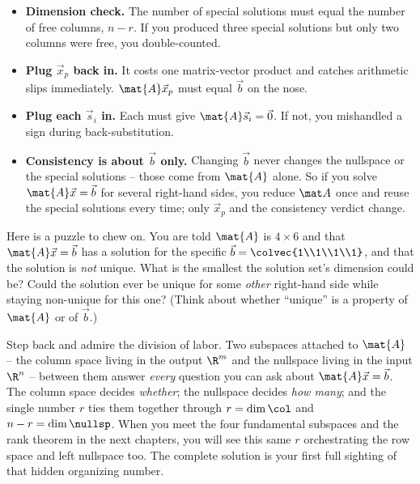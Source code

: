 \begin{itemize}
  \item \textbf{Dimension check.} The number of special solutions must equal the number of
    free columns, $n-r$. If you produced three special solutions but only two columns were
    free, you double-counted.
  \item \textbf{Plug $\vec{x}_p$ back in.} It costs one matrix-vector product and catches
    arithmetic slips immediately. $\mat{A}\vec{x}_p$ must equal $\vec{b}$ on the nose.
  \item \textbf{Plug each $\vec{s}_i$ in.} Each must give $\mat{A}\vec{s}_i=\vec{0}$. If
    not, you mishandled a sign during back-substitution.
  \item \textbf{Consistency is about $\vec{b}$ only.} Changing $\vec{b}$ never changes the
    nullspace or the special solutions -- those come from $\mat{A}$ alone. So if you solve
    $\mat{A}\vec{x}=\vec{b}$ for several right-hand sides, you reduce $\mat A$ once and
    reuse the special solutions every time; only $\vec{x}_p$ and the consistency verdict
    change.
\end{itemize}

\begin{walkbox}
Here is a puzzle to chew on. You are told $\mat{A}$ is $4\times6$ and that
$\mat{A}\vec{x}=\vec{b}$ has a solution for the specific $\vec{b}=\colvec{1\\1\\1\\1}$, and
that the solution is \emph{not} unique. What is the smallest the solution set's dimension
could be? Could the solution ever be unique for some \emph{other} right-hand side while
staying non-unique for this one? (Think about whether ``unique'' is a property of
$\mat{A}$ or of $\vec{b}$.)
\end{walkbox}

\begin{aestheticbox}
Step back and admire the division of labor. Two subspaces attached to $\mat{A}$ -- the
column space living in the output $\R^m$ and the nullspace living in the input $\R^n$ --
between them answer \emph{every} question you can ask about $\mat{A}\vec{x}=\vec{b}$. The
column space decides \emph{whether}; the nullspace decides \emph{how many}; and the single
number $r$ ties them together through $r=\dim\col$ and $n-r=\dim\nullsp$. When you meet the
four fundamental subspaces and the rank theorem in the next chapters, you will see this same
$r$ orchestrating the row space and left nullspace too. The complete solution is your first
full sighting of that hidden organizing number.
\end{aestheticbox}


